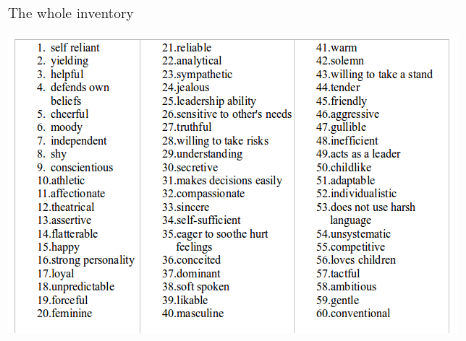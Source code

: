 \documentclass[
  ignorenonframetext,
]{beamer}
\begin{document}
\begin{frame}{The whole inventory}
\protect\hypertarget{the-whole-inventory}{}

\includegraphics[width=4.6875in,height=\textheight]{bem.png}

\end{frame}
\end{document}
